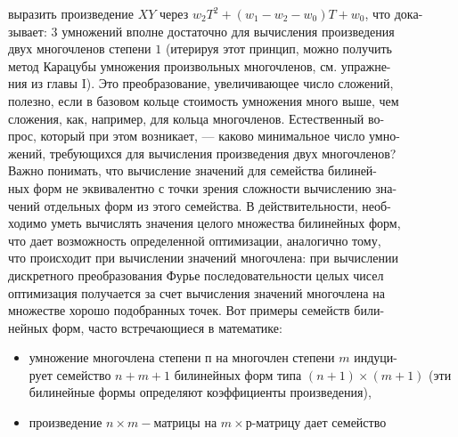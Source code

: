 \documentclass{mai_book}
\begin{document}
{	выразить произведение $XY$ через $w_2T^2+ (w_1 - w_2 - w_0)T+w_0$, что дока-\\зывает: $3$ умножений вполне достаточно для вычисления произведения \\
	двух многочленов степени $1$ (итерируя этот принцип, можно получить \\ метод Карацубы умножения произвольных многочленов, см.  
	упражне-\\ния из главы I). Это преобразование, увеличивающее число сложений, \\полезно, если в базовом кольце стоимость умножения много выше, чем \\сложения, как, например, для кольца многочленов. Естественный  во-\\прос, который при этом возникает, — каково минимальное число умно-\\жений, требующихся для вычисления произведения двух многочленов? \\
	\indent Важно понимать, что вычисление значений для семейства билиней-\\ных форм не эквивалентно с точки зрения сложности вычислению
	зна-\\чений отдельных форм из этого семейства. В действительности, необ-\\ходимо уметь вычислять значения целого множества билинейных форм, \\что дает возможность определенной оптимизации, аналогично тому, \\что происходит при вычислении значений многочлена: при вычислении  \\
	\newpage 
	\noindent дискретного преобразования Фурье последовательности целых чисел \\
	оптимизация получается за счет вычисления значений многочлена на \\
	множестве хорошо подобранных точек. Вот примеры семейств  
	били-\\нейных форм, часто встречающиеся в математике: 
	\smallskip
	\begin{itemize}
		\item умножение многочлена степени п на многочлен степени $m$  
		индуци-\\рует семейство $n+m+1$ билинейных форм типа $(n+1)\times (m+1)$ (эти 
		билинейные формы определяют коэффициенты произведения), 
		\item произведение $n\times m-$матрицы на $m\times р$-матрицу дает семейство \\

\end{itemize}}
\end{document}
